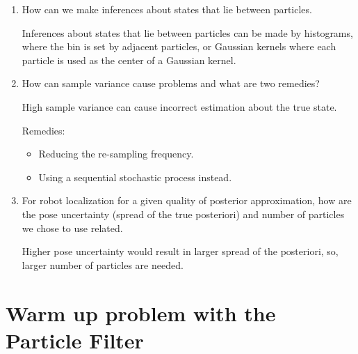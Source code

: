 \documentclass[11pt,a4paper]{article}
\begin{document}
\begin{enumerate}
	\item How can we make inferences about states that lie between particles.
		\par Inferences about states that lie between particles can be made by histograms, where the bin is set by adjacent particles, or Gaussian kernels where each particle is used as the center of a Gaussian kernel.

	\item How can sample variance cause problems and what are two remedies?
		\par High sample variance can cause incorrect estimation about the true state.
		\par Remedies:
		\begin{itemize}
			\item Reducing the re-sampling frequency.
			\item Using a sequential stochastic process instead.
		\end{itemize}

	\item For robot localization for a given quality of posterior approximation, how are the pose uncertainty (spread of the true posteriori) and number of particles we chose to use related.
		\par Higher pose uncertainty would result in larger spread of the posteriori, so, larger number of particles are needed. 
\end{enumerate}

\setcounter{Counter}{0}
\section{Warm up problem with the Particle Filter}
\end{document}
